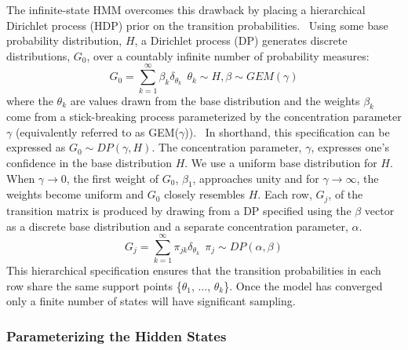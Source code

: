 \documentclass[journal=jpcbfk,manuscript=article]{achemso}
\begin{document}
  The infinite-state HMM overcomes this drawback by placing a hierarchical
  Dirichlet process (HDP) prior on the transition probabilities.~\cite{fox_bayesian_2010} Using some 
  base probability distribution, $H$, a Dirichlet process (DP) generates discrete 
  distributions, $G_0$, over a countably infinite number of probability measures:
  \begin{equation}
      G_0 = \sum_{k=1}^{\infty} \beta_k \delta_{\theta_k} ~~ \theta_k \sim H, \beta \sim GEM(\gamma)
  \end{equation}
  where the $\theta_k$ are values drawn from the base distribution and the weights
  $\beta_k$ come from a stick-breaking process parameterized by the concentration 
  parameter $\gamma$ (equivalently referred to as GEM($\gamma$)).~\cite{halmos_random_1944} In shorthand, this
  specification can be expressed as $G_0 \sim DP(\gamma, H)$. The concentration 
  parameter, $\gamma$, expresses one's confidence in the base distribution $H$.
  We use a uniform base distribution for $H$. When $\gamma\to 0$, the first 
  weight of $G_0$, $\beta_1$, approaches unity and for $\gamma\to\infty$, the weights
  become uniform and $G_0$ closely resembles $H$. Each row, $G_j$, of the transition 
  matrix is produced by drawing from a DP specified using the $\beta$ vector as a 
  discrete base distribution and a separate concentration parameter, $\alpha$.
  \begin{equation}
      G_j = \sum_{k=1}^{\infty} \pi_{jk} \delta_{\theta_k} ~~ \pi_j \sim DP(\alpha, \beta)
  \end{equation}
  This hierarchical specification ensures that the transition probabilities in 
  each row share the same support points \{$\theta_1$, ..., $\theta_k$\}.
  Once the model has converged only a finite number of states will have significant
  sampling.
  
  \subsubsection*{Parameterizing the Hidden States}\label{method:var_params}
  
\end{document}
